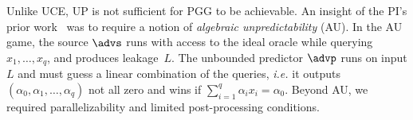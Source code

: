 {\begin{itemize}
Unlike UCE, UP is not sufficient for PGG to be achievable.
An insight of the PI's prior work~\cite{TCC:BFHO22} was to require a notion of \emph{algebraic unpredictability} (AU).
In the AU game, the source $\advs$ runs with access to the ideal oracle while querying $x_1, \ldots, x_q$, and produces leakage~$L$. The unbounded predictor $\advp$ runs on input $L$ and must guess a linear combination of the queries, \emph{i.e.} it outputs $(\alpha_0, \alpha_1, \ldots, \alpha_q)$ not all zero and wins if $\sum_{i=1}^q \alpha_i x_i = \alpha_0$. 
Beyond AU, we  required  parallelizability and limited post-processing conditions.



\end{itemize}}
